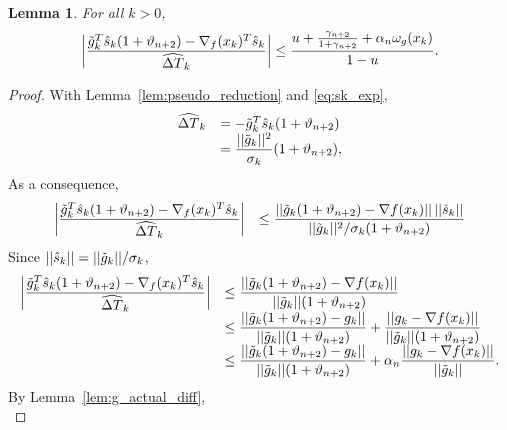 \documentclass{article}[12pt]
\newtheorem{lemma}[]{Lemma}
\begin{document}
    \begin{lemma}
    	\label{lem:gd_nabla_diff}
    	For all $k>0$,
    	\begin{equation}
    		\left|\dfrac{\tilde{g}_k^T\hat{s}_{k}(1+\vartheta_{n+2}) - \nabla_f(x_k)^T\hat{s}_{k}}{\widehat{\Delta T}_k}\right| \leq \dfrac{u+\frac{\gamma_{n+2}}{1+\gamma_{n+2}}+\alpha_n\omega_g(x_k)}{1-u}.
    	\end{equation}
    \end{lemma}
    \begin{proof}
    	With Lemma~\ref{lem:pseudo_reduction} and \eqref{eq:sk_exp},
    	\begin{equation*}
    		\begin{array}{ll}
    			\widehat{\Delta T}_k & = -\tilde{g}_k^T\hat{s}_{k}(1+\vartheta_{n+2})\\
    			& = \dfrac{||\tilde{g}_k||^2}{\sigma_k}(1+\vartheta_{n+2}),
    		\end{array}
    	\end{equation*}
    	As a consequence,
    	\begin{equation}
    		\begin{array}{ll}
    			\left|\dfrac{\tilde{g}_k^T\hat{s}_{k}(1+\vartheta_{n+2}) - \nabla_f(x_k)^T\hat{s}_{k}}{\widehat{\Delta T}_k}\right| & \leq \dfrac{||\tilde{g}_k(1+\vartheta_{n+2}) - \nabla f(x_k)|| \, ||\hat{s}_{k}||}{||\tilde{g}_k||^2/\sigma_k(1+\vartheta_{n+2})}\\
    		\end{array}
    	\end{equation}
    	Since $||\hat{s}_{k}|| = ||\tilde{g}_k||/\sigma_k$,
    	\begin{equation}
    		\label{eq:gd_nabla_diff_proof_1}
    		\begin{array}{ll}
    			\left|\dfrac{\tilde{g}_k^T\hat{s}_{k}(1+\vartheta_{n+2}) - \nabla_f(x_k)^T\hat{s}_{k}}{\widehat{\Delta T}_k}\right| & \leq \dfrac{||\tilde{g}_k(1+\vartheta_{n+2}) - \nabla f(x_k)||}{||\tilde{g}_k||(1+\vartheta_{n+2})}\\
    			& \leq \dfrac{||\tilde{g}_k(1+\vartheta_{n+2}) - g_k||}{||\tilde{g}_k||(1+\vartheta_{n+2})} + \dfrac{||g_k - \nabla f(x_k)||}{||\tilde{g}_k||(1+\vartheta_{n+2})}\\
    			& \leq \dfrac{||\tilde{g}_k(1+\vartheta_{n+2}) - g_k||}{||\tilde{g}_k||(1+\vartheta_{n+2})} + \alpha_n\dfrac{||g_k - \nabla f(x_k)||}{||\tilde{g}_k||}.\\
    		\end{array}
    	\end{equation}
    	By Lemma~\ref{lem:g_actual_diff},
    	\begin{equation}
    		\label{eq:gd_nabla_diff_proof_2}

\end{equation}
\end{proof}
\end{document}
